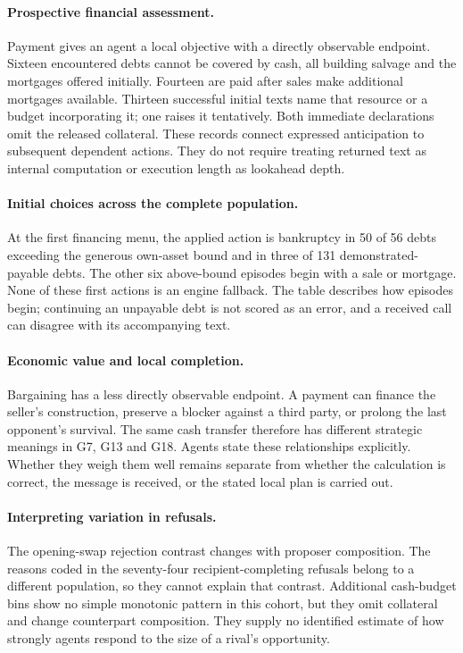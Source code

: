 \paragraph{Prospective financial assessment.}
Payment gives an agent a local objective with a directly observable endpoint. Sixteen encountered debts cannot be covered by cash, all building salvage and the mortgages offered initially. Fourteen are paid after sales make additional mortgages available. Thirteen successful initial texts name that resource or a budget incorporating it; one raises it tentatively. Both immediate declarations omit the released collateral. These records connect expressed anticipation to subsequent dependent actions. They do not require treating returned text as internal computation or execution length as lookahead depth.

\paragraph{Initial choices across the complete population.}
At the first financing menu, the applied action is bankruptcy in 50 of 56 debts exceeding the generous own-asset bound and in three of 131 demonstrated-payable debts. The other six above-bound episodes begin with a sale or mortgage. None of these first actions is an engine fallback. The table describes how episodes begin; continuing an unpayable debt is not scored as an error, and a received call can disagree with its accompanying text.

\paragraph{Economic value and local completion.}
Bargaining has a less directly observable endpoint. A payment can finance the seller's construction, preserve a blocker against a third party, or prolong the last opponent's survival. The same cash transfer therefore has different strategic meanings in G7, G13 and G18. Agents state these relationships explicitly. Whether they weigh them well remains separate from whether the calculation is correct, the message is received, or the stated local plan is carried out.

\paragraph{Interpreting variation in refusals.}
The opening-swap rejection contrast changes with proposer composition. The reasons coded in the seventy-four recipient-completing refusals belong to a different population, so they cannot explain that contrast. Additional cash-budget bins show no simple monotonic pattern in this cohort, but they omit collateral and change counterpart composition. They supply no identified estimate of how strongly agents respond to the size of a rival's opportunity.

